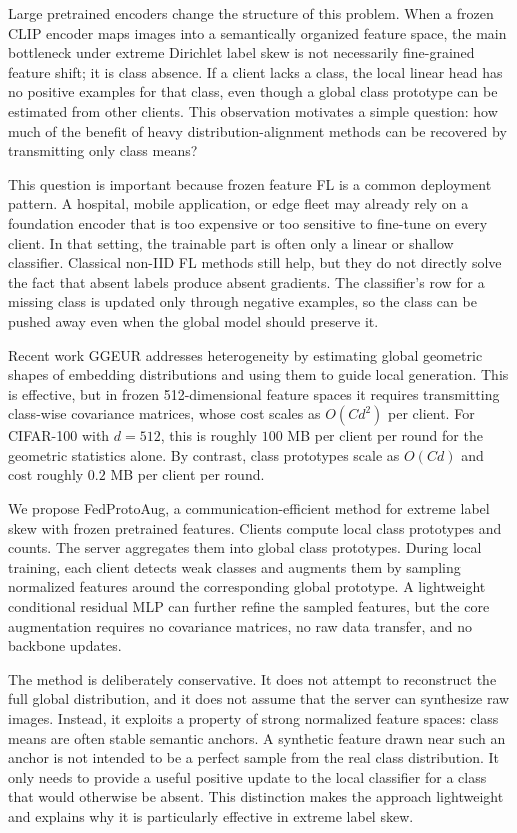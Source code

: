 ﻿\documentclass[runningheads]{llncs}
\newcommand{\method}{FedProtoAug}
\newcommand{\clip}{CLIP}
\begin{document}
Large pretrained encoders change the structure of this problem. When a frozen \clip{} encoder \cite{radford2021clip} maps images into a semantically organized feature space, the main bottleneck under extreme Dirichlet label skew is not necessarily fine-grained feature shift; it is class absence. If a client lacks a class, the local linear head has no positive examples for that class, even though a global class prototype can be estimated from other clients. This observation motivates a simple question: how much of the benefit of heavy distribution-alignment methods can be recovered by transmitting only class means?

This question is important because frozen feature FL is a common deployment pattern. A hospital, mobile application, or edge fleet may already rely on a foundation encoder that is too expensive or too sensitive to fine-tune on every client. In that setting, the trainable part is often only a linear or shallow classifier. Classical non-IID FL methods still help, but they do not directly solve the fact that absent labels produce absent gradients. The classifier's row for a missing class is updated only through negative examples, so the class can be pushed away even when the global model should preserve it.

Recent work GGEUR \cite{ma2025ggeur} addresses heterogeneity by estimating global geometric shapes of embedding distributions and using them to guide local generation. This is effective, but in frozen 512-dimensional feature spaces it requires transmitting class-wise covariance matrices, whose cost scales as $O(Cd^2)$ per client. For CIFAR-100 with $d=512$, this is roughly $100$ MB per client per round for the geometric statistics alone. By contrast, class prototypes scale as $O(Cd)$ and cost roughly $0.2$ MB per client per round.

We propose \method, a communication-efficient method for extreme label skew with frozen pretrained features. Clients compute local class prototypes and counts. The server aggregates them into global class prototypes. During local training, each client detects weak classes and augments them by sampling normalized features around the corresponding global prototype. A lightweight conditional residual MLP can further refine the sampled features, but the core augmentation requires no covariance matrices, no raw data transfer, and no backbone updates.

The method is deliberately conservative. It does not attempt to reconstruct the full global distribution, and it does not assume that the server can synthesize raw images. Instead, it exploits a property of strong normalized feature spaces: class means are often stable semantic anchors. A synthetic feature drawn near such an anchor is not intended to be a perfect sample from the real class distribution. It only needs to provide a useful positive update to the local classifier for a class that would otherwise be absent. This distinction makes the approach lightweight and explains why it is particularly effective in extreme label skew.
\end{document}
